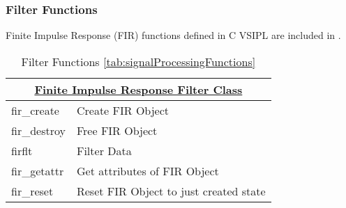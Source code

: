 \subsubsection*{Filter Functions} 
Finite Impulse Response (FIR) functions defined in C VSIPL are included in \pyjv. 
\begin{table}[H]
\caption{Filter Functions \ref{tab:signalProcessingFunctions}}
\label{tab:filterFunctions}
\begin{center}
\begin{tabular}{|l|l|}
\multicolumn{2}{c}{\hyperlink{firFunc}{\rmfamily \bfseries Finite Impulse Response Filter Class}} \\ \hline
fir\_create & Create FIR Object\\
fir\_destroy & Free FIR Object\\
firflt & Filter Data\\
fir\_getattr & Get attributes of FIR Object\\
fir\_reset & Reset FIR Object to just created state\\ \hline
\end{tabular}
\end{center}
\label{default}
\end{table}%